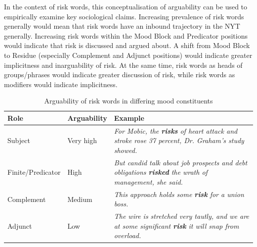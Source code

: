 

	  In the context of risk words, this conceptualisation of arguability can be used to empirically examine key sociological claims. Increasing prevalence of risk words generally would mean that risk words have an inbound trajectory in the NYT generally. Increasing risk words within the Mood Block and Predicator positions would indicate that risk is discussed and argued about. A shift from Mood Block to Residue (especially Complement and Adjunct positions) would indicate greater implicitness and inarguability of risk. At the same time, risk words as heads of groups/phrases would indicate greater discussion of risk, while risk words as modifiers would indicate implicitness.

    \begin{table}
    \centering
    \footnotesize
    \begin{tabularx}{.70\textwidth}{|L{.50}|L{.50}|L{2}|}%
    \hline
    \textbf{Role}              & \textbf{Arguability} & \textbf{Example} \\ \hline
    Subject           & Very high   & \emph{For Mobic, the \textbf{risks} of heart attack and stroke rose 37 percent, Dr. Graham's study showed.}       \\ \hline
    Finite\slash Predicator & High        & \emph{But candid talk about job prospects and debt obligations \textbf{risked} the wrath of management, she said.}       \\ \hline
    Complement        & Medium      & \emph{This approach holds some \textbf{risk} for a union boss.}       \\ \hline
    Adjunct           & Low         & \emph{The wire is stretched very tautly, and we are at some significant \textbf{risk} it will snap from overload.}       \\ \hline
    \end{tabularx}
    \caption{Arguability of risk words in differing mood constituents}
    \end{table}

